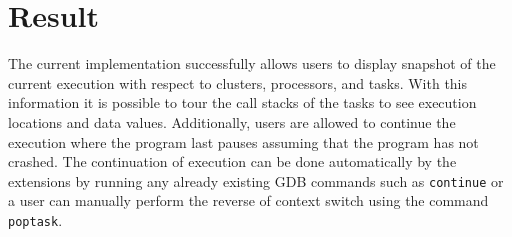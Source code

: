 \section{Result}
The current implementation successfully allows users to display snapshot of the
current execution with respect to clusters, processors, and tasks. With this
information it is possible to tour the call stacks of the tasks to see execution
locations and data values. Additionally, users are allowed to continue the execution where the
program last pauses assuming that the program has not crashed. The continuation
of execution can be done automatically by the extensions by running any already
existing GDB commands such as \verb|continue| or a user can manually
perform the reverse of context switch using the command \verb|poptask|.

